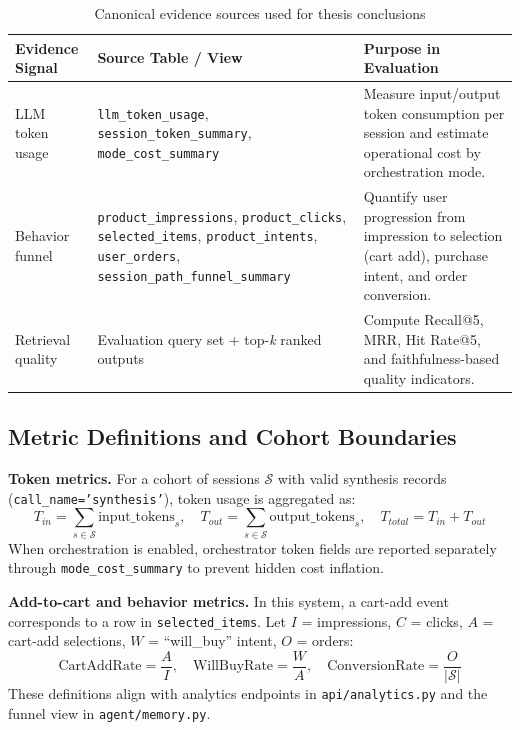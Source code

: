 \begin{table}[H]
\centering
\begin{tabular}{p{3.2cm}p{4.1cm}p{6.6cm}}
\toprule
\textbf{Evidence Signal} & \textbf{Source Table / View} & \textbf{Purpose in Evaluation}\\
\midrule
LLM token usage & \texttt{llm\_token\_usage}, \texttt{session\_token\_summary}, \texttt{mode\_cost\_summary} & Measure input/output token consumption per session and estimate operational cost by orchestration mode.\\
Behavior funnel & \texttt{product\_impressions}, \texttt{product\_clicks}, \texttt{selected\_items}, \texttt{product\_intents}, \texttt{user\_orders}, \texttt{session\_path\_funnel\_summary} & Quantify user progression from impression to selection (cart add), purchase intent, and order conversion.\\
Retrieval quality & Evaluation query set + top-\textit{k} ranked outputs & Compute Recall@5, MRR, Hit Rate@5, and faithfulness-based quality indicators.\\
\bottomrule
\end{tabular}
\caption{Canonical evidence sources used for thesis conclusions}
\label{tab:canonical_evidence_sources}
\end{table}

\subsection{Metric Definitions and Cohort Boundaries}
\label{subsec:metric_definitions_boundaries}

\textbf{Token metrics.}
For a cohort of sessions $\mathcal{S}$ with valid synthesis records (\texttt{call\_name='synthesis'}), token usage is aggregated as:
\begin{equation}
T_{in}=\sum_{s \in \mathcal{S}} \text{input\_tokens}_s,\quad
T_{out}=\sum_{s \in \mathcal{S}} \text{output\_tokens}_s,\quad
T_{total}=T_{in}+T_{out}
\end{equation}
When orchestration is enabled, orchestrator token fields are reported separately through \texttt{mode\_cost\_summary} to prevent hidden cost inflation.

\textbf{Add-to-cart and behavior metrics.}
In this system, a cart-add event corresponds to a row in \texttt{selected\_items}. Let $I$ = impressions, $C$ = clicks, $A$ = cart-add selections, $W$ = ``will\_buy'' intent, $O$ = orders:
\begin{equation}
\text{CartAddRate}=\frac{A}{I},\quad
\text{WillBuyRate}=\frac{W}{A},\quad
\text{ConversionRate}=\frac{O}{|\mathcal{S}|}
\end{equation}
These definitions align with analytics endpoints in \texttt{api/analytics.py} and the funnel view in \texttt{agent/memory.py}.

